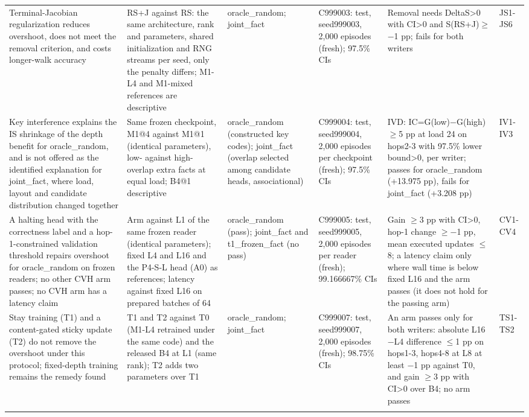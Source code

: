 \begin{landscape}
{\begin{longtable}{W{209}{12}W{209}{12}W{148}{12}W{185}{12}W{209}{12}W{40}{12}}
Terminal-Jacobian regularization reduces overshoot, does not meet the removal criterion, and costs longer-walk accuracy & RS+J against RS: the same architecture, rank and parameters, shared initialization and RNG streams per seed, only the penalty differs; M1-L4 and M1-mixed references are descriptive & oracle\_random; joint\_fact & C999003: test, seed999003, 2,000 episodes (fresh); 97.5\% CIs & Removal needs DeltaS>0 with CI>0 and S(RS+J)\ensuremath{\geq}\ensuremath{-}1 pp; fails for both writers & JS1-JS6 \\ \addlinespace[3pt]  %
Key interference explains the IS shrinkage of the depth benefit for oracle\_random, and is not offered as the identified explanation for joint\_fact, where load, layout and candidate distribution changed together & Same frozen checkpoint, M1@4 against M1@1 (identical parameters), low- against high-overlap extra facts at equal load; B4@1 descriptive & oracle\_random (constructed key codes); joint\_fact (overlap selected among candidate heads, associational) & C999004: test, seed999004, 2,000 episodes per checkpoint (fresh); 97.5\% CIs & IVD: IC=G(low)\ensuremath{-}G(high)\ensuremath{\geq}5 pp at load 24 on hops2-3 with 97.5\% lower bound>0, per writer; passes for oracle\_random (+13.975 pp), fails for joint\_fact (+3.208 pp) & IV1-IV3 \\ \addlinespace[3pt]  %
A halting head with the correctness label and a hop-1-constrained validation threshold repairs overshoot for oracle\_random on frozen readers; no other CVH arm passes; no CVH arm has a latency claim & Arm against L1 of the same frozen reader (identical parameters); fixed L4 and L16 and the P4-S-L head (A0) as references; latency against fixed L16 on prepared batches of 64 & oracle\_random (pass); joint\_fact and t1\_frozen\_fact (no pass) & C999005: test, seed999005, 2,000 episodes per reader (fresh); 99.166667\% CIs & Gain \ensuremath{\geq}3 pp with CI>0, hop-1 change \ensuremath{\geq}\ensuremath{-}1 pp, mean executed updates \ensuremath{\leq}8; a latency claim only where wall time is below fixed L16 and the arm passes (it does not hold for the passing arm) & CV1-CV4 \\ \addlinespace[3pt]  %
Stay training (T1) and a content-gated sticky update (T2) do not remove the overshoot under this protocol; fixed-depth training remains the remedy found & T1 and T2 against T0 (M1-L4 retrained under the same code) and the released B4 at L1 (same rank); T2 adds two parameters over T1 & oracle\_random; joint\_fact & C999007: test, seed999007, 2,000 episodes (fresh); 98.75\% CIs & An arm passes only for both writers: absolute L16\ensuremath{-}L4 difference \ensuremath{\leq}1 pp on hops1-3, hops4-8 at L8 at least \ensuremath{-}1 pp against T0, and gain \ensuremath{\geq}3 pp with CI>0 over B4; no arm passes & TS1-TS2 \\ \addlinespace[3pt]  %

\end{longtable}}
\end{landscape}
